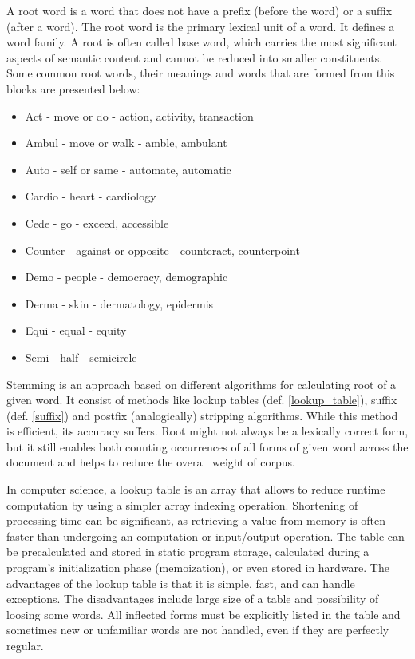  \begin{definition}
 	\label{root}
A root word is a word that does not have a prefix (before the word) or a suffix (after a word). The root word is the primary lexical unit of a word. It defines a word family. A root is often called base word, which carries the most significant aspects of semantic content and cannot be reduced into smaller constituents. 
Some common root words, their meanings and words that are formed from this blocks are presented below:
\begin{itemize}
	\item Act  - move or do - action, activity, transaction
	\item Ambul -  move or walk - amble, ambulant
	\item Auto -  self or same -  automate, automatic
	\item Cardio -  heart - cardiology
	\item Cede -  go -  exceed, accessible
	\item Counter -  against or opposite - counteract, counterpoint 
	\item Demo -  people - democracy, demographic
	\item Derma -  skin - dermatology, epidermis
	\item Equi -  equal - equity
	\item Semi -  half - semicircle \\
\end{itemize}
\end{definition}


Stemming is an approach based on different algorithms for calculating root of a given word. It consist of methods like lookup tables (def. \ref{lookup_table}), suffix (def. \ref{suffix}) and postfix (analogically) stripping algorithms. While this method is efficient, its accuracy suffers. Root might not always be a lexically correct form, but it still enables both counting occurrences of all forms of given word across the document and helps to reduce the overall weight of corpus.\\

 \begin{definition}
 	\label{lookup_table}
In computer science, a lookup table is an array that allows to reduce runtime computation by using a simpler array indexing operation. Shortening of processing time can be significant, as retrieving a value from memory is often faster than undergoing an computation or input/output operation. The table can be precalculated and stored in static program storage, calculated during a program's initialization phase (memoization), or even stored in hardware.
The advantages of the lookup table is that it is simple, fast, and can handle exceptions. The disadvantages include large size of a table and possibility of loosing some words. All inflected forms must be explicitly listed in the table and sometimes new or unfamiliar words are not handled, even if they are perfectly regular.\\ 
\end{definition}


